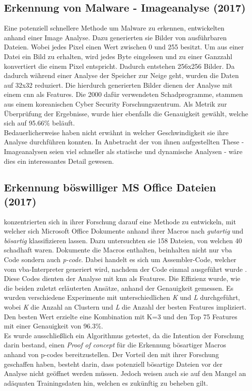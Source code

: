 \documentclass[
    12pt, %
    DIV10,
    ngerman, %
    a4paper, %
    oneside, %
    titlepage, %
    parskip=half, %
    headings=normal, %
    listof=totoc, %
    bibliography=totoc, %
    index=totoc, %
    captions=tableheading, %
    final %
]{scrreprt}
\begin{document}
\subsection{Erkennung von Malware - Imageanalyse (2017)}
Eine potenziell schnellere Methode um Malware zu erkennen, entwickelten \textcite{8190895} anhand einer Image Analyse. Dazu generierten sie Bilder von ausführbaren Dateien. Wobei jedes Pixel einen Wert zwischen 0 und 255 besitzt. Um aus einer Datei ein Bild zu erhalten, wird jedes Byte eingelesen und zu einer Ganzzahl konvertiert die einem Pixel entspricht. Dadurch entstehen 256x256 Bilder. Da dadurch während einer Analyse der Speicher zur Neige geht, wurden die Daten auf 32x32 reduziert. Die hierdurch generierten Bilder dienen der Analyse mit einem \ac{cnn} als Features. Die 2000 dafür verwendeten Schadprogramme, stammen aus einem koreanischen Cyber Security Forschungszentrum. Als Metrik zur Überprüfung der Ergebnisse, wurde hier ebenfalls die Genauigkeit gewählt, welche sich auf 95.66\% beläuft.\\
Bedauerlicherweise haben \textcite{8190895} nicht erwähnt in welcher Geschwindigkeit sie ihre Analyse durchführen konnten. In Anbetracht der von ihnen aufgestellten These - Imageanalysen seien viel schneller als statische und dynamische Analysen - wäre dies ein interessantes Detail gewesen.

%
\subsection{Erkennung böswilliger MS Office Dateien (2017)}
\textcite{Bearden2018} konzentrierten sich in ihrer Forschung darauf eine Methode zu entwickeln, mit welcher sich Microsoft Office Dokumente anhand ihrer Macros nach \emph{gutartig} und \emph{bösartig} klassifizieren lassen. Dazu untersuchten sie 158 Dateien, von welchen 40 schadhaft waren. Dokumente die Macros enthalten, beinhalten nicht nur \ac{vba} Code sondern auch \emph{p-code}. Dabei handelt es sich um Assembler-Code, welcher vom \ac{vba}-Interpreter generiert wird, nachdem der Code einmal ausgeführt wurde \parencite{Bearden2018}. Diese Codes dienten der Analyse mit \ac{knn} als Features. Die Effizienz wurde, wie die beiden zuletzt erläuterten Ansätze, anhand der Genauigkeit gemessen. Es wurden verschiedene Experimente mit unterschiedlichen \emph{K} und \emph{L} durchgeführt, wobei \emph{K} die Anzahl an Clustern und \emph{L} die Anzahl der besten Features impliziert. Den besten Wert erzielte eine Kombination mit K=3 und den Top 75 Features mit einer Genauigkeit von 96.3\%.\\Es wurde ausschlie{\ss}lich ein Algorithmus getestet, da die Intention der Forschung darin bestand, einen \emph{Proof of concept} für die Erkennung bösartiger Macros anhand von p-codes bereitzustellen. Der Vorteil den \textcite{Bearden2018} mit ihrer Forschung geschaffen haben, besteht darin, dass potenziell bösartige Dateien vor der Analyse nicht geöffnet werden müssen. Jedoch weisen auch sie auf den Mangel an adäquaten Trainingsdaten hin, welchen es zukünftig zu beheben gilt.
%
\end{document}
